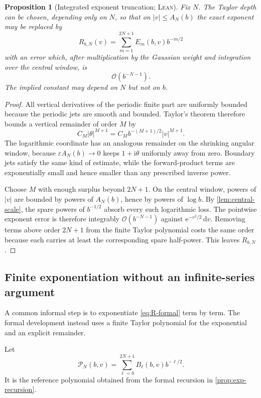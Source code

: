 \documentclass[11pt,oneside]{article}
\newtheorem{proposition}[theorem]{Proposition}
\theoremstyle{definition}
\theoremstyle{remark}
\newcommand{\e}{\mathrm e}
\newcommand{\ii}{\mathrm i}
\newcommand{\dd}{\,\mathrm d}
\newcommand{\bigO}{\mathcal O}
\newcommand{\Formalized}{\textsc{Lean}}
\begin{document}
\begin{proposition}[Integrated exponent truncation; \Formalized]
\label{prop:exponent-truncation}
Fix $N$.  The Taylor depth can be chosen, depending only on $N$, so that
on $|v|\leq A_N(b)$ the exact exponent may be replaced by
\[
 R_{b,N}(v)
 =\sum_{m=1}^{2N+1}E_m(b,v)b^{-m/2}
\]
with an error which, after multiplication by the Gaussian weight and
integration over the central window, is
\[
 \bigO(b^{-N-1}).
\]
The implied constant may depend on $N$ but not on $b$.
\end{proposition}

\begin{proof}
All vertical derivatives of the periodic finite part are uniformly
bounded because the periodic jets are smooth and bounded.  Taylor's
theorem therefore bounds a vertical remainder of order $M$ by
\[
 C_M|\theta|^{M+1}
 =C_M b^{-(M+1)/2}|v|^{M+1}.
\]
The logarithmic coordinate has an analogous remainder on the shrinking
angular window, because $\varepsilon A_N(b)\to0$ keeps
$1+\ii\theta$ uniformly away from zero.  Boundary jets satisfy the same
kind of estimate, while the forward-product terms are exponentially
small and hence smaller than any prescribed inverse power.

Choose $M$ with enough surplus beyond $2N+1$.  On the central window,
powers of $|v|$ are bounded by powers of $A_N(b)$, hence by powers of
$\log b$.  By \cref{lem:central-scale}, the spare powers of $b^{-1/2}$
absorb every such logarithmic loss.  The pointwise exponent error is
therefore integrably $\bigO(b^{-N-1})$ against
$\e^{-v^2/2}\dd v$.  Removing terms above order $2N+1$ from the finite
Taylor polynomial costs the same order because each carries at least the
corresponding spare half-power.  This leaves $R_{b,N}$.
\end{proof}

\subsection{Finite exponentiation without an infinite-series argument}

A common informal step is to exponentiate \eqref{eq:R-formal} term by
term.  The formal development instead uses a finite Taylor polynomial for
the exponential and an explicit remainder.

Let
\[
 \mathcal P_N(b,v)
 =\sum_{\ell=0}^{2N+1}B_\ell(b,v)b^{-\ell/2}.
 \label{eq:reference-polynomial}
\]
It is the reference polynomial obtained from the formal recursion in
\cref{prop:exp-recursion}.
\end{document}
